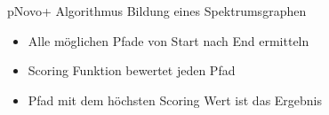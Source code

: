 \documentclass{beamer}
\newcommand{\gerquot}[1]{\glqq#1\grqq}
\newcommand{\dashAndSpace}{\textendash \space}
\newcommand{\highlightColor}{nDarkBlue!55!}
\begin{document}
\begin{frame}{pNovo+ Algorithmus \dashAndSpace Bildung eines Spektrumsgraphen}
{\begin{tikzpicture}[scale=.7,auto=left,every node/.style={circle,fill=blue!20}]
            \end{tikzpicture}
        }%
        \begin{itemize}
            \item<3-> Alle möglichen Pfade von Start nach End ermitteln
            \item<3-> Scoring Funktion \gerquot{bewertet} jeden Pfad
            \item<3-> Pfad mit dem \textcolor{\highlightColor}{höchsten Scoring Wert} ist das Ergebnis
        \end{itemize}
    \end{frame}
\end{document}
